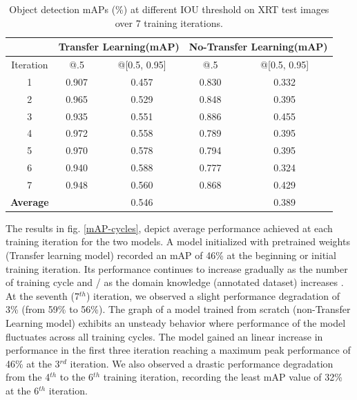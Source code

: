 \documentclass[conference]{IEEEtran}
\begin{document}
		
		\begin{table}[htbp]
			\caption{Object detection mAPs (\%) at different IOU threshold on XRT test images over 7 training iterations.} 
			\centering
			\begin{tabular}{|c|c|c|c|c|}
				\hline
				& \multicolumn{2}{|c|}{\textbf{Transfer Learning\newline (mAP)}}
				& \multicolumn{2}{|c|}{\textbf{No-Transfer Learning\newline (mAP)}}\\ 
				
				\hline
				Iteration & @.5 & @[0.5, 0.95] & @.5 & @[0.5, 0.95]\\
				
				\hline
				1 & 0.907 & 0.457  & 0.830 & 0.332\\
				
				\hline
				2 & 0.965 & 0.529 & 0.848 & 0.395\\
				
				\hline
				3 & 0.935 & 0.551 & 0.886 & 0.455\\
				
				\hline
				4 & 0.972 & 0.558 & 0.789 & 0.395\\
				
				\hline
				5 & 0.970 & 0.578& 0.794 & 0.395 \\
				\hline
				
				6 & 0.940 & 0.588 & 0.777 & 0.324\\
				
				\hline
				7 & 0.948 & 0.560& 0.868 & 0.429 \\
				\hline
				\textbf{Average}& & 0.546& & 0.389\\	
				\hline	
			\end{tabular} 
			\label{table}
		\end{table}

		The results in fig. \ref{mAP-cycles}, depict average performance achieved at each training iteration for the two models. A model initialized with pretrained weights (Transfer learning model) recorded an mAP of 46\% at the beginning or initial training iteration. Its performance continues to increase
gradually as the number of training cycle and / as the domain knowledge (annotated dataset) increases . At the seventh (7$ ^{th} $) iteration, we observed a slight performance degradation of 3\% (from 59\% to 56\%). The graph of a model trained from scratch (non-Transfer Learning model) exhibits an unsteady behavior where performance of the model fluctuates across all training cycles. The model gained an linear increase in performance in the first three iteration reaching a maximum peak performance of 46\% at the 3$ ^{rd} $ iteration. We
 also observed a drastic performance degradation from the 4$ ^{th} $ to the 6$ ^{th} $ training iteration, recording the least mAP value of 32\% at the 6$ ^{th} $ iteration.
	
\end{document}
